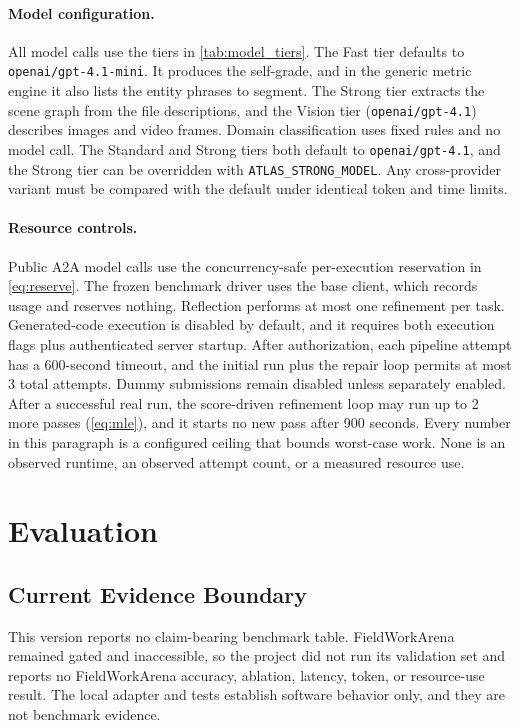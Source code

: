 \documentclass{article}
\begin{document}
\paragraph{Model configuration.}
All model calls use the tiers in \cref{tab:model_tiers}. The Fast tier defaults to \texttt{openai/gpt-4.1-mini}. It produces the self-grade, and in the generic metric engine it also lists the entity phrases to segment. The Strong tier extracts the scene graph from the file descriptions, and the Vision tier (\texttt{openai/gpt-4.1}) describes images and video frames. Domain classification uses fixed rules and no model call. The Standard and Strong tiers both default to \texttt{openai/gpt-4.1}, and the Strong tier can be overridden with \texttt{ATLAS\_STRONG\_MODEL}. Any cross-provider variant must be compared with the default under identical token and time limits.

\paragraph{Resource controls.}
Public A2A model calls use the concurrency-safe per-execution reservation in \cref{eq:reserve}. The frozen benchmark driver uses the base client, which records usage and reserves nothing. Reflection performs at most one refinement per task. Generated-code execution is disabled by default, and it requires both execution flags plus authenticated server startup. After authorization, each pipeline attempt has a 600-second timeout, and the initial run plus the repair loop permits at most 3 total attempts. Dummy submissions remain disabled unless separately enabled. After a successful real run, the score-driven refinement loop may run up to 2 more passes (\cref{eq:mle}), and it starts no new pass after 900 seconds. Every number in this paragraph is a configured ceiling that bounds worst-case work. None is an observed runtime, an observed attempt count, or a measured resource use.

\section{Evaluation}
\label{sec:evaluation}

\subsection{Current Evidence Boundary}
\label{sec:boundary}

This version reports no claim-bearing benchmark table. FieldWorkArena remained gated and inaccessible, so the project did not run its validation set and reports no FieldWorkArena accuracy, ablation, latency, token, or resource-use result. The local adapter and tests establish software behavior only, and they are not benchmark evidence.
\end{document}
